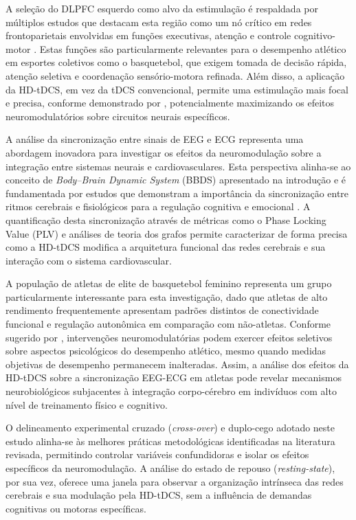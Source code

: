 A seleção do DLPFC esquerdo como alvo da estimulação é respaldada por múltiplos estudos que destacam esta região como um nó crítico em redes frontoparietais envolvidas em funções executivas, atenção e controle cognitivo-motor \cite{dong2023efficacy, arif2021high, jones2017frontoparietal}. Estas funções são particularmente relevantes para o desempenho atlético em esportes coletivos como o basquetebol, que exigem tomada de decisão rápida, atenção seletiva e coordenação sensório-motora refinada. Além disso, a aplicação da HD-tDCS, em vez da tDCS convencional, permite uma estimulação mais focal e precisa, conforme demonstrado por , potencialmente maximizando os efeitos neuromodulatórios sobre circuitos neurais específicos.

A análise da sincronização entre sinais de EEG e ECG representa uma abordagem inovadora para investigar os efeitos da neuromodulação sobre a integração entre sistemas neurais e cardiovasculares. Esta perspectiva alinha-se ao conceito de \textit{Body--Brain Dynamic System} (BBDS) apresentado na introdução e é fundamentada por estudos que demonstram a importância da sincronização entre ritmos cerebrais e fisiológicos para a regulação cognitiva e emocional \cite{criscuolo2022cognition, vergara2024exploring}. A quantificação desta sincronização através de métricas como o Phase Locking Value (PLV) e análises de teoria dos grafos permite caracterizar de forma precisa como a HD-tDCS modifica a arquitetura funcional das redes cerebrais e sua interação com o sistema cardiovascular.

A população de atletas de elite de basquetebol feminino representa um grupo particularmente interessante para esta investigação, dado que atletas de alto rendimento frequentemente apresentam padrões distintos de conectividade funcional e regulação autonômica em comparação com não-atletas. Conforme sugerido por , intervenções neuromodulatórias podem exercer efeitos seletivos sobre aspectos psicológicos do desempenho atlético, mesmo quando medidas objetivas de desempenho permanecem inalteradas. Assim, a análise dos efeitos da HD-tDCS sobre a sincronização EEG-ECG em atletas pode revelar mecanismos neurobiológicos subjacentes à integração corpo-cérebro em indivíduos com alto nível de treinamento físico e cognitivo.

O delineamento experimental cruzado (\textit{cross-over}) e duplo-cego adotado neste estudo alinha-se às melhores práticas metodológicas identificadas na literatura revisada, permitindo controlar variáveis confundidoras e isolar os efeitos específicos da neuromodulação. A análise do estado de repouso (\textit{resting-state}), por sua vez, oferece uma janela para observar a organização intrínseca das redes cerebrais e sua modulação pela HD-tDCS, sem a influência de demandas cognitivas ou motoras específicas.

